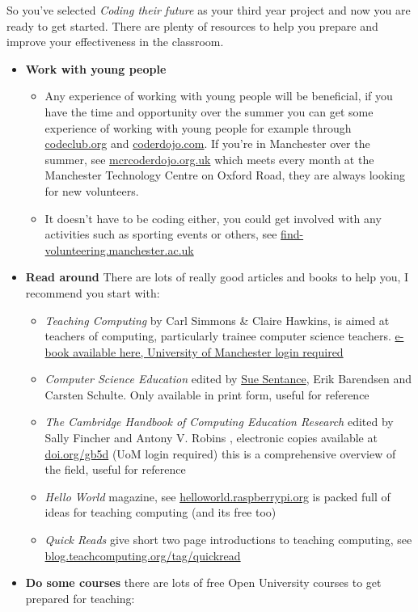 \documentclass[
  12pt,
]{book}
\providecommand{\tightlist}{%
  \setlength{\itemsep}{0pt}\setlength{\parskip}{0pt}}
\begin{document}
So you've selected \emph{Coding their future} as your third year project and now you are ready to get started. There are plenty of resources to help you prepare and improve your effectiveness in the classroom.

\begin{itemize}
\tightlist
\item
  \textbf{Work with young people}

  \begin{itemize}
  \tightlist
  \item
    Any experience of working with young people will be beneficial, if you have the time and opportunity over the summer you can get some experience of working with young people for example through \href{https://codeclub.org/}{codeclub.org} and \href{https://coderdojo.com/}{coderdojo.com}. If you're in Manchester over the summer, see \href{https://mcrcoderdojo.org.uk/}{mcrcoderdojo.org.uk} which meets every month at the Manchester Technology Centre on Oxford Road, they are always looking for new volunteers.
  \item
    It doesn't have to be coding either, you could get involved with any activities such as sporting events or others, see \href{https://find-volunteering.manchester.ac.uk/}{find-volunteering.manchester.ac.uk}
  \end{itemize}
\item
  \textbf{Read around} There are lots of really good articles and books to help you, I recommend you start with:

  \begin{itemize}
  \tightlist
  \item
    \emph{Teaching Computing} \citep{teachingcomputing} by Carl Simmons \& Claire Hawkins, is aimed at teachers of computing, particularly trainee computer science teachers. \href{http://dx.doi.org.manchester.idm.oclc.org/10.4135/9781473919785}{e-book available here, University of Manchester login required}
  \item
    \emph{Computer Science Education} \citep{cse} edited by \href{https://en.wikipedia.org/wiki/Sue_Sentance}{Sue Sentance}, Erik Barendsen and Carsten Schulte. Only available in print form, useful for reference
  \item
    \emph{The Cambridge Handbook of Computing Education Research} edited by Sally Fincher and Antony V. Robins \citep{CERhandbook}, electronic copies available at \href{https://doi.org/gb5d}{doi.org/gb5d} (UoM login required) this is a comprehensive overview of the field, useful for reference
  \item
    \emph{Hello World} magazine, see \href{https://helloworld.raspberrypi.org/}{helloworld.raspberrypi.org} is packed full of ideas for teaching computing (and its free too)
  \item
    \emph{Quick Reads} give short two page introductions to teaching computing, see \href{https://blog.teachcomputing.org/tag/quickread/}{blog.teachcomputing.org/tag/quickread}
  \end{itemize}
\item
  \textbf{Do some courses} there are lots of free Open University courses to get prepared for teaching:


\end{itemize}
\end{document}
